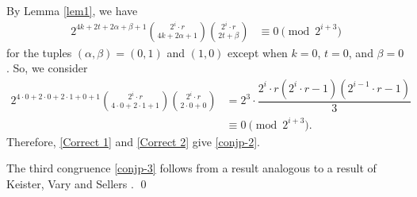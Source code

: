 \documentclass[12pt,reqno]{amsart}
\numberwithin{equation}{section}
\begin{document}
By Lemma \ref{lem1}, we have
\begin{align}
2^{4k+2t+2\alpha+\beta+1}\binom{2^i\cdot r}{4k+2\alpha+1}
\binom{2^i\cdot r}{2t+\beta}&\equiv 0 \pmod{2^{i+3}}\label{Correct 2}
\end{align}
for the tuples $(\alpha,\beta)=(0,1)$ and $(1,0)$ except when $k=0$, $t=0$, and $\beta=0$. So, we consider 
\begin{align*}
    2^{4\cdot 0+2\cdot 0+2\cdot 1+0+1}\binom{2^i\cdot r}{4\cdot 0+2\cdot 1+1}
\binom{2^i\cdot r}{2\cdot 0+0}&= 2^3\cdot \dfrac{2^i\cdot r\left(2^{i}\cdot r-1\right)\left(2^{i-1}\cdot r-1\right)}{3}\\
&\equiv 0 \pmod{2^{i+3}}.
\end{align*}
Therefore, \eqref{Correct 1} and \eqref{Correct 2} give \eqref{conjp-2}. 

The third congruence \eqref{conjp-3} follows from a result analogous to a result of Keister, Vary and Sellers \cite[Theorem 9]{KeisterSellersVary}. \qed
\end{document}
